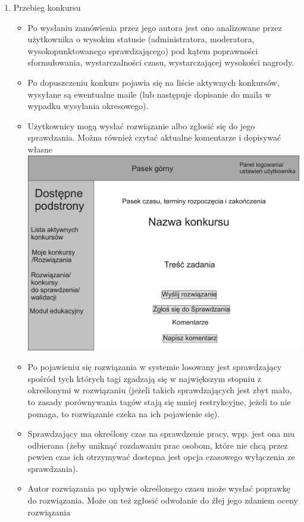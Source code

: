 \documentclass{article}
\begin{document}
\begin{enumerate}
\begin{enumerate}
\begin{itemize}
     \end{itemize}
    \newpage
    \item Przebieg konkursu
    \begin{itemize}
     \item Po wysłaniu zamówienia przez jego autora jest ono analizowane przez użytkownika o wysokim statusie (administratora, moderatora, wysokopunktowanego sprawdzającego)
     pod kątem poprawności sformułowania, wystarczalności czasu, wystarczającej wysokości nagrody.
     \item Po dopuszczeniu konkurs pojawia się na liście aktywnych konkursów, wysyłane są ewentualne maile (lub następuje dopisanie do maila w wypadku wysyłania okresowego).
     \item Użytkownicy mogą wysłać rozwiązanie albo zgłosić się do jego sprawdzania. Można również czytać aktualne komentarze i dopisywać własne\\
	  \includegraphics[scale=0.5]{IO_rysunki2.jpg}      
     \item Po pojawieniu się rozwiązania w systemie losowany jest sprawdzający spośród tych których tagi zgadzają się w największym stopniu z określonymi w rozwiązaniu
     (jeżeli takich sprawdzających jest zbyt mało, to zasady porównywania tagów stają się mniej restrykcyjne, jeżeli to nie pomaga, to rozwiązanie czeka na ich pojawienie się).
     \item Sprawdzający ma określony czas na sprawdzenie pracy, wpp. jest ona mu odbierana
     (żeby uniknąć rozdawaniu prac osobom, które nie chcą przez pewien czas ich otrzymywać dostepna jest opcja czasowego wyłączenia ze sprawdzania).
     \item Autor rozwiązania po upływie określonego czasu może wysłać poprawkę do rozwiązania. Może on też zgłosić odwołanie do źłej jego zdaniem oceny rozwiązania

\end{itemize}
\end{enumerate}
\end{enumerate}
\end{document}
